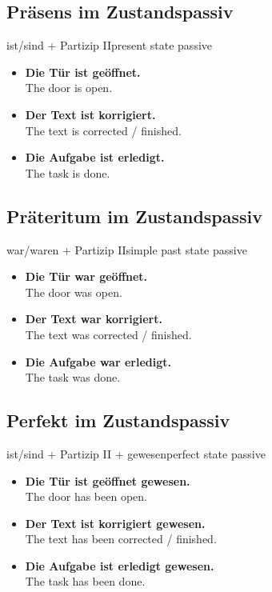 \documentclass[a4paper,11pt]{article}
\newcommand{\ExampleItem}[2]{\item \textbf{#1}\\{\small\color{SoftGray}#2}}
\begin{document}
\subsection{Präsens im Zustandspassiv}

\begin{grammarentry}{ist/sind + Partizip II}{present state passive}
\begin{exbox}
\begin{itemize}
    \ExampleItem{Die Tür ist geöffnet.}{The door is open.}
    \ExampleItem{Der Text ist korrigiert.}{The text is corrected / finished.}
    \ExampleItem{Die Aufgabe ist erledigt.}{The task is done.}
\end{itemize}
\end{exbox}
\end{grammarentry}

\subsection{Präteritum im Zustandspassiv}

\begin{grammarentry}{war/waren + Partizip II}{simple past state passive}
\begin{exbox}
\begin{itemize}
    \ExampleItem{Die Tür war geöffnet.}{The door was open.}
    \ExampleItem{Der Text war korrigiert.}{The text was corrected / finished.}
    \ExampleItem{Die Aufgabe war erledigt.}{The task was done.}
\end{itemize}
\end{exbox}
\end{grammarentry}

\subsection{Perfekt im Zustandspassiv}

\begin{grammarentry}{ist/sind + Partizip II + gewesen}{perfect state passive}
\begin{exbox}
\begin{itemize}
    \ExampleItem{Die Tür ist geöffnet gewesen.}{The door has been open.}
    \ExampleItem{Der Text ist korrigiert gewesen.}{The text has been corrected / finished.}
    \ExampleItem{Die Aufgabe ist erledigt gewesen.}{The task has been done.}
\end{itemize}
\end{exbox}
\end{grammarentry}
\end{document}
